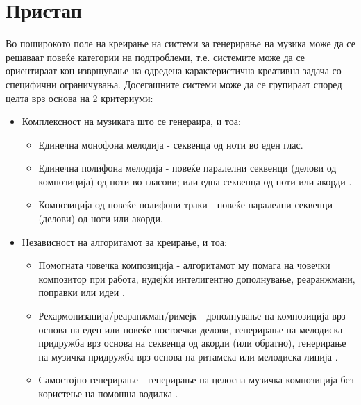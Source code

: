 \chapter{Пристап}
\label{ch:pristap}

Во поширокото поле на креирање на системи за генерирање на музика може да се решаваат повеќе категории на подпроблеми, т.е. системите може да се ориентираат кон извршување на одредена карактеристична креативна задача со специфични ограничувања. Досегашните системи може да се групираат според целта врз основа на 2 критериуми:
\begin{itemize}
    \item Комплексност на музиката што се генераира, и тоа: \begin{itemize}
        \item Единечна монофона мелодија - секвенца од ноти во еден глас. \cite{Biles1994,Cope1991,Zils2001,GarciaSalas2011,Schwarz2006,Eck2002,Eck2008,Tikhonov2017,Sturm2016,Bretan2016}
        \item Единечна полифона мелодија - повеќе паралелни секвенци (делови од композиција) од ноти во гласови; или една секвенца од ноти или акорди \cite{Hadjeres2016,Boulanger-Lewandowski2012, Boulanger-Lewandowski2014,Goel2014,Liang2017}.
        \item Композиција од повеќе полифони траки - повеќе паралелни секвенци (делови) од ноти или акорди. \cite{Yang2017,Dong2017,Dong2018,Johnson2017}
    \end{itemize}
    \item Независност на алгоритамот за креирање, и тоа: \begin{itemize}
        \item Помогната човечка композиција - алгоритамот му помага на човечки композитор при работа, нудејќи интелигентно дополнување, реаранжмани, поправки или идеи \cite{Ghedini2015}.
        \item Рехармонизација/реаранжман/римејк - дополнување на композиција врз основа на еден или повеќе постоечки делови, генерирање на мелодиска придружба врз основа на секвенца од акорди (или обратно), генерирање на музичка придружба врз основа на ритамска или мелодиска линија \cite{Hadjeres2016,Liang2017}.
        \item Самостојно генерирање - генерирање на целосна музичка композиција без користење на помошна водилка \cite{Boulanger-Lewandowski2012, Boulanger-Lewandowski2014,Goel2014,Yang2017,Dong2017,Dong2018,Johnson2017}.
    \end{itemize}
\end{itemize}

